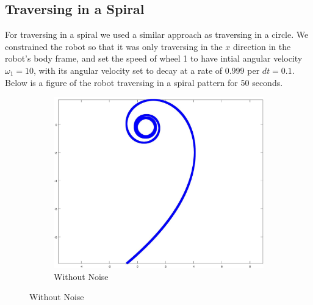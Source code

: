 \documentclass{article}
\begin{document}
\newpage
\subsection{Traversing in a Spiral}
\label{subsec:traverse_spiral}

For traversing in a spiral we used a similar approach as traversing in a 
circle. We constrained the robot so that it was only traversing in the $x$ 
direction in the robot's body frame, and set the speed of wheel 1 to have 
intial angular velocity $\omega_{1} = 10$, with its angular velocity set to 
decay at a rate of $0.999$ per $dt = 0.1$. Below is a figure of the robot 
traversing in a spiral pattern for 50 seconds.

\begin{figure}[H]
	\centering
	\begin{subfigure}[b]{0.45\linewidth}
		\includegraphics[width=\textwidth]{images/traverse_spiral.jpg}
		\caption{Without Noise}
	\end{subfigure}
	

\end{figure}
\end{document}
